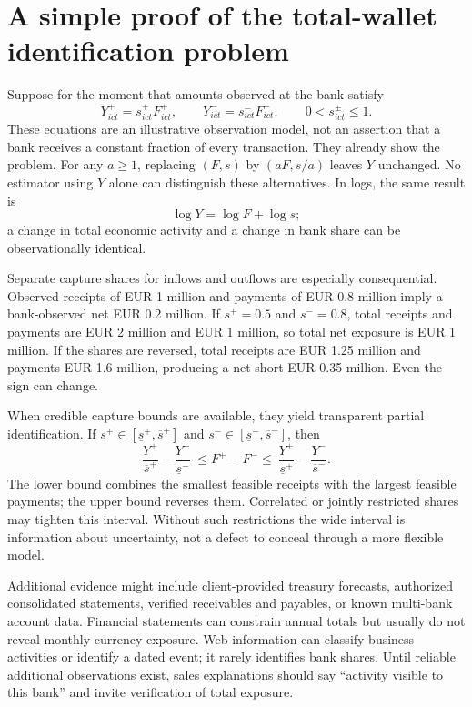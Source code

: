 \section{A simple proof of the total-wallet identification problem}
Suppose for the moment that amounts observed at the bank satisfy
\begin{equation}
Y^+_{ict}=s^+_{ict}F^+_{ict},\qquad
Y^-_{ict}=s^-_{ict}F^-_{ict},\qquad 0<s^\pm_{ict}\leq1.
\label{eq:capture}
\end{equation}
These equations are an illustrative observation model, not an assertion that a bank receives a constant fraction of every transaction. They already show the problem. For any $a\geq1$, replacing $(F,s)$ by $(aF,s/a)$ leaves $Y$ unchanged. No estimator using $Y$ alone can distinguish these alternatives. In logs, the same result is
\begin{equation}
\log Y=\log F+\log s;
\end{equation}
a change in total economic activity and a change in bank share can be observationally identical.

Separate capture shares for inflows and outflows are especially consequential. Observed receipts of EUR 1 million and payments of EUR 0.8 million imply a bank-observed net EUR 0.2 million. If $s^+=0.5$ and $s^-=0.8$, total receipts and payments are EUR 2 million and EUR 1 million, so total net exposure is EUR 1 million. If the shares are reversed, total receipts are EUR 1.25 million and payments EUR 1.6 million, producing a net short EUR 0.35 million. Even the sign can change.

When credible capture bounds are available, they yield transparent partial identification. If $s^+\in[\underline s^+,\overline s^+]$ and $s^-\in[\underline s^-,\overline s^-]$, then
\begin{equation}
\frac{Y^+}{\overline s^+}-\frac{Y^-}{\underline s^-}
\ \leq F^+-F^-\leq\
\frac{Y^+}{\underline s^+}-\frac{Y^-}{\overline s^-}.
\label{eq:capturebounds}
\end{equation}
The lower bound combines the smallest feasible receipts with the largest feasible payments; the upper bound reverses them. Correlated or jointly restricted shares may tighten this interval. Without such restrictions the wide interval is information about uncertainty, not a defect to conceal through a more flexible model.

Additional evidence might include client-provided treasury forecasts, authorized consolidated statements, verified receivables and payables, or known multi-bank account data. Financial statements can constrain annual totals but usually do not reveal monthly currency exposure. Web information can classify business activities or identify a dated event; it rarely identifies bank shares. Until reliable additional observations exist, sales explanations should say ``activity visible to this bank'' and invite verification of total exposure.

